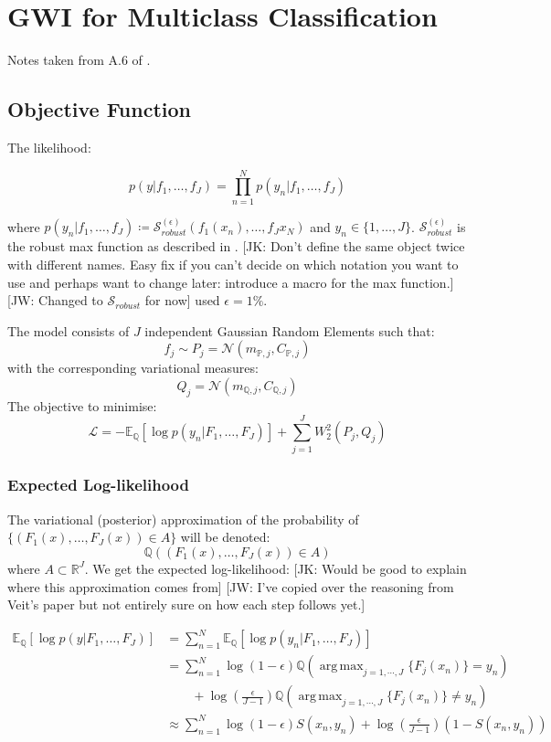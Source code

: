 \documentclass[twoside,11pt]{article}
\newcommand{\jk}[1]{{\color{blue} [JK: #1]}}
\newcommand{\jw}[1]{{\color{gray} [JW: #1]}}
\DeclareMathOperator*{\argmax}{arg\,max}
\begin{document}
\section{GWI for Multiclass Classification}\label{sec:gwi-for-multiclass-classification}
Notes taken from A.6 of \cite{wild2022generalized}.

\subsection{Objective Function}\label{subsec:gwi-for-multiclass-classification-objective-function}

The likelihood:

\[p(y|f_1, \dots, f_J) = \prod_{n=1}^N p(y_n | f_1, \dots, f_J)\]

where $p(y_n | f_1, \dots, f_J) \coloneqq \mathcal{S}_{robust}^{(\epsilon)}(f_1(x_n), \dots , f_J{x_N})$ and $y_n \in \{1, \dots, J\}$.
$\mathcal{S}_{robust}^{(\epsilon)}$ is the robust max function as described in \cite{matthews2017scalable}.
%
\jk{Don't define the same object twice with different names. Easy fix if you can't decide on which notation you want to use and perhaps want to change later: introduce a macro for the max function.}
%
%
\jw{Changed to $\mathcal{S}_{robust}$ for now}
%
\cite{wild2022generalized} used $\epsilon = 1 \%$.

The model consists of $J$ independent Gaussian Random Elements such that:
\[f_j \sim P_j = \mathcal{N}(m_{\mathbb{P}, j}, C_{\mathbb{P}, j})\]
with the corresponding variational measures:
\[Q_j = \mathcal{N}(m_{\mathbb{Q}, j}, C_{\mathbb{Q}, j})\]
The objective to minimise:
\[\mathcal{L} = -\mathbb{E}_{\mathbb{Q}}\left[ \log p(y_n | F_1, \dots, F_J)\right] + \sum_{j=1}^{J} W_2^2(P_j, Q_j)\]

\subsubsection{Expected Log-likelihood}\label{subsec:expected-log-likelihood}

The variational (posterior) approximation of the probability of $\{(F_1(x), \dots, F_J(x)) \in A\}$ will be denoted:
\[\mathbb{Q}\left( (F_1(x), \dots, F_J(x)) \in A\right)\]
where $A \subset \mathbb{R}^J$.
We get the expected log-likelihood:
%
\jk{Would be good to explain where this approximation comes from}
\jw{I've copied over the reasoning from Veit's paper but not entirely sure on how each step follows yet.}
%

\begin{align*}
\mathbb{E}_{\mathbb{Q}}\left[ \log p(y | F_1, \dots, F_J)\right] &= \sum_{n=1}^{N}\mathbb{E}_{\mathbb{Q}}\left[ \log p(y_n | F_1, \dots, F_J)\right]\\
&= \sum_{n=1}^{N}\log(1-\epsilon)\mathbb{Q}\left( \argmax_{j=1, \cdots, J} \{F_j(x_n)\} = y_n\right)\\
& \qquad + \log\left(\frac{\epsilon}{J-1}\right)\mathbb{Q}\left( \argmax_{j=1, \cdots, J} \{F_j(x_n)\} \neq y_n\right)\\
&\approx \sum_{n=1}^{N} \log(1-\epsilon)S(x_n, y_n) + \log \left(\frac{\epsilon}{J-1}\right)(1-S(x_n, y_n))
\end{align*}
\end{document}
